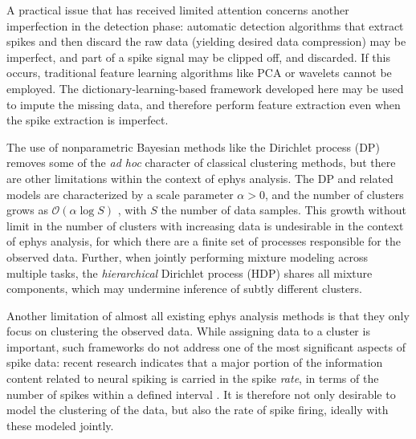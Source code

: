 \documentclass[journal]{IEEEtran}
\begin{document}
A practical issue that has received limited attention concerns another imperfection in the detection phase: automatic detection algorithms that extract spikes and then discard the raw data (yielding desired data compression) may be imperfect, and part of a spike signal may be clipped off, and discarded. If this occurs, traditional feature learning algorithms like PCA or wavelets cannot be employed. The dictionary-learning-based framework developed here may be used to impute the missing data, and therefore perform feature extraction even when the spike extraction is imperfect.

The use of nonparametric Bayesian methods like the Dirichlet process (DP) \cite{Wood2009,Bo2011} removes some of the \emph{ad hoc} character of classical clustering methods, but there are other limitations within the context of ephys analysis. The DP and related models are characterized by a scale parameter $\alpha>0$, and the number of clusters grows as $\mathcal{O}(\alpha \log S)$ \cite{Teh2010a}, with $S$ the number of data samples. This growth without limit in the number of clusters with increasing data is undesirable in the context of ephys analysis, for which there are a finite set of processes responsible for the observed data. Further, when jointly performing mixture modeling across multiple tasks, the \emph{hierarchical} Dirichlet process (HDP) \cite{HDP} shares all mixture components, which may undermine inference of subtly different clusters.

Another limitation of almost all existing ephys analysis methods is that they only focus on clustering the observed data. While assigning data to a cluster is important, such frameworks do not address one of the most significant aspects of spike data: recent research indicates that a major portion of the  information content related to neural spiking is carried in the spike \emph{rate}, in terms of the number of spikes within a defined interval \cite{Donoghue07}. It is therefore not only desirable to model the clustering of the data, but also the rate of spike firing, ideally with these modeled jointly.
\end{document}
